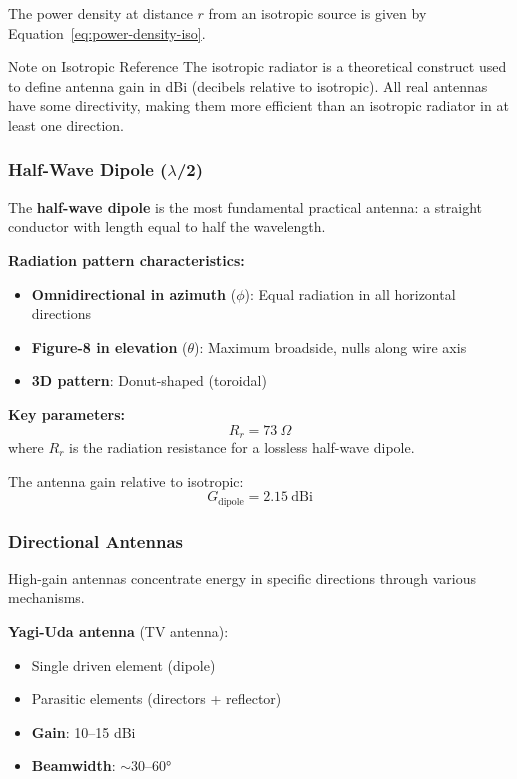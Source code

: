 The power density at distance $r$ from an isotropic source is given by Equation~\ref{eq:power-density-iso}.

\begin{calloutbox}{Note on Isotropic Reference}
The isotropic radiator is a theoretical construct used to define antenna gain in dBi (decibels relative to isotropic). All real antennas have some directivity, making them more efficient than an isotropic radiator in at least one direction.
\end{calloutbox}

\subsubsection{Half-Wave Dipole ($\lambda$/2)}

The \textbf{half-wave dipole} is the most fundamental practical antenna: a straight conductor with length equal to half the wavelength.

\textbf{Radiation pattern characteristics:}
\begin{itemize}
\item \textbf{Omnidirectional in azimuth} ($\phi$): Equal radiation in all horizontal directions
\item \textbf{Figure-8 in elevation} ($\theta$): Maximum broadside, nulls along wire axis
\item \textbf{3D pattern}: Donut-shaped (toroidal)
\end{itemize}

\textbf{Key parameters:}
\begin{equation}
R_r = 73\ \Omega
\label{eq:dipole-radiation-resistance}
\end{equation}
where $R_r$ is the radiation resistance for a lossless half-wave dipole.

The antenna gain relative to isotropic:
\begin{equation}
G_{\text{dipole}} = 2.15\ \text{dBi}
\label{eq:dipole-gain}
\end{equation}

\subsubsection{Directional Antennas}

High-gain antennas concentrate energy in specific directions through various mechanisms.

\textbf{Yagi-Uda antenna} (TV antenna):
\begin{itemize}
\item Single driven element (dipole)
\item Parasitic elements (directors + reflector)
\item \textbf{Gain}: 10--15 dBi
\item \textbf{Beamwidth}: $\sim$30--60$°$
\end{itemize}

